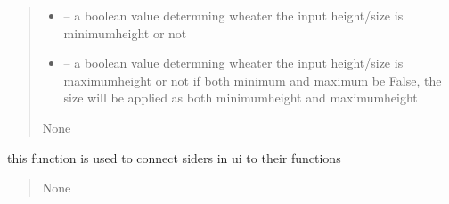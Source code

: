 \documentclass[letterpaper,10pt,english]{sphinxmanual}
\begin{document}
\begin{savenotes}
\begin{fulllineitems}
\begin{savenotes}
\begin{fulllineitems}
\begin{quote}
\begin{description}
\begin{itemize}
\item {} 
\sphinxAtStartPar
{} – a boolean value determning wheater the input height/size is minimumheight or not

\item {} 
\sphinxAtStartPar
{} – a boolean value determning wheater the input height/size is maximumheight or not
if both minimum and maximum be False, the size will be applied as both minimumheight and maximumheight

\end{itemize}

\sphinxAtStartPar
None

\end{description}\end{quote}

\end{fulllineitems}\end{savenotes}


\begin{savenotes}\begin{fulllineitems}
\label{\detokenize{setting/setting_UI:oxin.setting_UI.UI_main_window.set_sliders}}
\pysigstartsignatures
{}
\pysigstopsignatures
\sphinxAtStartPar
this function is used to connect siders in ui to their functions
\begin{quote}\begin{description}
\sphinxAtStartPar
None

\end{description}\end{quote}

\end{fulllineitems}\end{savenotes}



\end{fulllineitems}
\end{savenotes}
\end{document}
